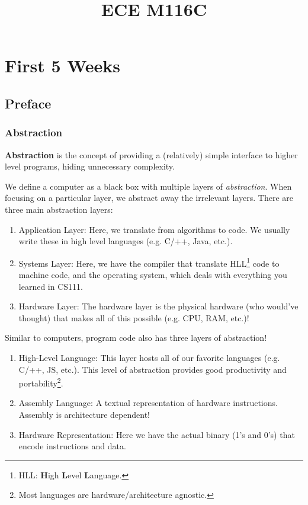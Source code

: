 \documentclass{report}
\title{ECE M116C}
\date{}
\newcommand{\definition}[2]{\begin{tcolorbox}[title={Definition: #1}]{#2}\end{tcolorbox}}
\begin{document}
\maketitle

\tableofcontents
\newpage

\part{First 5 Weeks}
\chapter{Preface}
\section{Abstraction}
\definition{Abstraction}{
  \textbf{Abstraction} is the concept of providing a (relatively) simple interface to higher level
  programs, hiding unnecessary complexity.
}

We define a computer as a black box with multiple layers of \textit{abstraction}. When focusing on a
particular layer, we abstract away the irrelevant layers. There are three main abstraction layers:

\begin{enumerate}[label=\textit{(\roman*)}] 
\item Application Layer: Here, we translate from algorithms to code. We usually write these in high
  level languages (e.g. C/++, Java, etc.).
\item Systems Layer: Here, we have the compiler that translate HLL\footnote{HLL: \textbf{H}igh
    \textbf{L}evel \textbf{L}anguage.} code to machine code, and the operating system, which deals with
  everything you learned in CS111.
\item Hardware Layer: The hardware layer is the physical hardware (who would've thought) that makes
  all of this possible (e.g. CPU, RAM, etc.)!
\end{enumerate}
Similar to computers, program code also has three layers of abstraction!

\begin{enumerate}[label=\textit{(\roman*)}] 
\item High-Level Language: This layer hosts all of our favorite languages (e.g. C/++, JS,
  etc.). This level of abstraction provides good productivity and portability\footnote{Most
    languages are hardware/architecture agnostic.}. 
\item Assembly Language: A textual representation of hardware instructions. Assembly is architecture
  dependent!
\item Hardware Representation: Here we have the actual binary (1's and 0's) that encode instructions
  and data.  
\end{enumerate}
\end{document}
